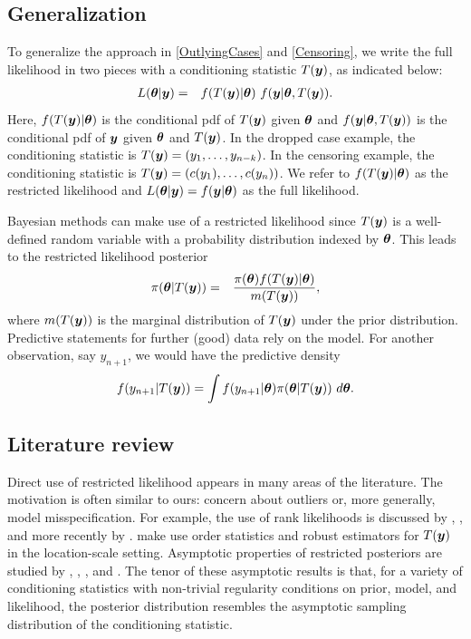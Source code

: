\documentclass[ba]{imsart}
\def\bth{\mbox{\boldmath $\theta$}}
\newcommand{\by}{\mbox{\boldmath $y$}}
\begin{document}
\subsection{Generalization}

To generalize the approach in \eqref{OutlyingCases} and
\eqref{Censoring}, %
we write the full likelihood in two pieces with a conditioning statistic $T(\by)$, as indicated below:
\begin{eqnarray}
\label{FullLikelihood}
L(\bth | \by)  
& = & f(T(\by) | \bth) \,\, f(\by |\bth, T(\by)) .  
\end{eqnarray}
Here,  $f(T(\by) | \bth)$ is the conditional pdf of $T(\by)$ given $\bth$ and $f(\by |\bth, T(\by))$ is the conditional pdf of $\by$ given $\bth$ and $T(\by)$.  In the dropped case example, the conditioning statistic is $T(\by) = (y_1, \ldots, y_{n-k})$.  In 
the censoring example, the conditioning statistic is $T(\by) = (c(y_1),\ldots,c(y_n))$.  We refer to 
$f(T(\by) | \bth)$ as the restricted likelihood and $L(\bth | \by)=f(\by|\bth)$ as the full likelihood.  

Bayesian methods can make use of a restricted likelihood %
since $T(\by)$ is a well-defined random variable with a probability distribution indexed by $\bth$.  
This leads to the restricted likelihood posterior 
\begin{eqnarray}
\label{RestrictedPosterior}
\pi(\bth | T(\by)) & = & \frac{\pi(\bth) f(T(\by) | \bth)}{m(T(\by))} ,
\end{eqnarray}
where $m(T(\by))$ is the marginal distribution of $T(\by)$ under the prior distribution.  
Predictive statements for further (good) data rely on the model.  For another observation,
say $y_{n+1}$, we would have the predictive density 
\begin{eqnarray}
\label{RestrictedpredDist}
f(y_{n+1} | T(\by)) = \int f(y_{n+1} | \bth) \pi(\bth | T(\by))\ d\bth .  
\end{eqnarray}

\subsection{Literature review}
Direct use of restricted likelihood appears in many areas of the literature.  The motivation is often similar to ours:   
concern about outliers or, more generally, model misspecification.  For example, the use of rank likelihoods is discussed by \cite{savage1969}, \cite{pettitt1983, pettitt1982}, and more recently by \cite{hoff2013}.  
\cite{lewis2012} make use order statistics and robust estimators for $T(\by)$ in the location-scale setting. 
Asymptotic properties of restricted posteriors are studied by \cite{doksum1990}, \cite{clarke1995}, \cite{yuan2004},  and \cite{hwang2005}. The tenor of these asymptotic 
results is that, for a variety of conditioning statistics with non-trivial regularity conditions on prior, model, and likelihood, the
posterior distribution resembles the asymptotic sampling distribution of the conditioning statistic.  
\end{document}
